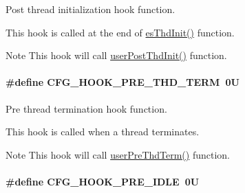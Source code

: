 Post thread initialization hook function. 

This hook is called at the end of \hyperlink{group__kern__thd_gac91734f3ee867b519f59bf81cc7fde88}{es\-Thd\-Init()} function. \begin{DoxyNote}{Note}
This hook will call \hyperlink{group__kern__hook_ga64ca864d0ff2aaa532208d7c2b88bdb3}{user\-Post\-Thd\-Init()} function. 
\end{DoxyNote}
\hypertarget{group__template__kern__cfg_ga9c7dd4e009a89e9cffb0f9b404bc6250}{
\paragraph[{C\-F\-G\-\_\-\-H\-O\-O\-K\-\_\-\-P\-R\-E\-\_\-\-T\-H\-D\-\_\-\-T\-E\-R\-M}]{\setlength{\rightskip}{0pt plus 5cm}\#define C\-F\-G\-\_\-\-H\-O\-O\-K\-\_\-\-P\-R\-E\-\_\-\-T\-H\-D\-\_\-\-T\-E\-R\-M~0\-U}}\label{group__template__kern__cfg_ga9c7dd4e009a89e9cffb0f9b404bc6250}


Pre thread termination hook function. 

This hook is called when a thread terminates. \begin{DoxyNote}{Note}
This hook will call \hyperlink{group__kern__hook_ga076ad76633999c9d5e245e3b5c6e0c09}{user\-Pre\-Thd\-Term()} function. 
\end{DoxyNote}
\hypertarget{group__template__kern__cfg_ga7c2b0410404256c4804758090401f7e4}{
\paragraph[{C\-F\-G\-\_\-\-H\-O\-O\-K\-\_\-\-P\-R\-E\-\_\-\-I\-D\-L\-E}]{\setlength{\rightskip}{0pt plus 5cm}\#define C\-F\-G\-\_\-\-H\-O\-O\-K\-\_\-\-P\-R\-E\-\_\-\-I\-D\-L\-E~0\-U}}\label{group__template__kern__cfg_ga7c2b0410404256c4804758090401f7e4}


